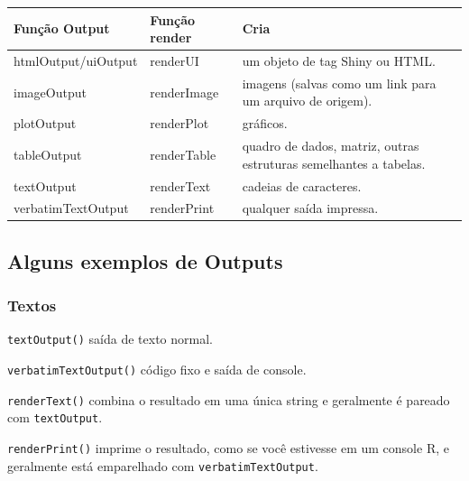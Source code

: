 \documentclass[
]{book}
\begin{document}
\begin{longtable}[]{@{}
  >{\raggedright\arraybackslash}p{}
  >{\raggedright\arraybackslash}p{}
  >{\raggedright\arraybackslash}p{}@{}}
\toprule
Função Output & Função render & Cria \\
\midrule
\endhead
htmlOutput/uiOutput & renderUI & um objeto de tag Shiny ou HTML. \\
imageOutput & renderImage & imagens (salvas como um link para um arquivo de origem). \\
plotOutput & renderPlot & gráficos. \\
tableOutput & renderTable & quadro de dados, matriz, outras estruturas semelhantes a tabelas. \\
textOutput & renderText & cadeias de caracteres. \\
verbatimTextOutput & renderPrint & qualquer saída impressa. \\
\bottomrule
\end{longtable}

\hypertarget{alguns-exemplos-de-outputs}{%
\subsection{\texorpdfstring{\textbf{Alguns exemplos de Outputs}}{Alguns exemplos de Outputs}}\label{alguns-exemplos-de-outputs}}

\hypertarget{textos}{%
\subsubsection{\texorpdfstring{\textbf{Textos}}{Textos}}\label{textos}}

\texttt{textOutput()} saída de texto normal.

\texttt{verbatimTextOutput()} código fixo e saída de console.

\texttt{renderText()} combina o resultado em uma única string e geralmente é pareado com \texttt{textOutput}.

\texttt{renderPrint()} imprime o resultado, como se você estivesse em um console R, e geralmente está emparelhado com \texttt{verbatimTextOutput}.
\end{document}
